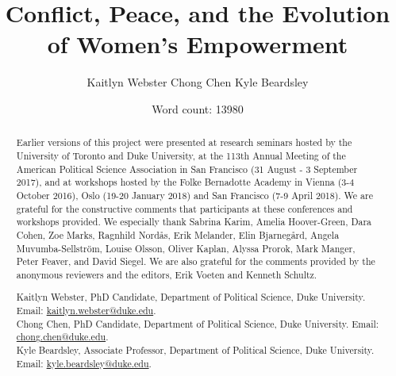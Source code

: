 \documentclass [12pt] {article}
\begin{document}
\renewcommand{\thefootnote}{\fnsymbol{footnote}}
\title{ \Large{Conflict, Peace, and the Evolution of Women's Empowerment}\footnotemark[1]\vspace*{.2in}}
\author{Kaitlyn Webster \hspace*{.2in} Chong Chen \hspace*{.2in} Kyle Beardsley \vspace*{.3in}}
\date{Word count: 13980}
\maketitle
\thispagestyle{empty}
\singlespacing
\renewcommand{\thefootnote}{\arabic{footnote}}

\newpage
\renewcommand{\abstractname}{\large Acknowledgments}
\begin{abstract}
  \bigskip
	\noindent
	Earlier versions of this project were presented at research seminars hosted by the University of Toronto and Duke University, at the 113th Annual Meeting of the American Political Science Association in San Francisco (31 August - 3 September 2017), and at workshops hosted by the Folke Bernadotte Academy in Vienna (3-4 October 2016), Oslo (19-20 January 2018) and San Francisco (7-9 April 2018). We are grateful for the constructive comments that participants at these conferences and workshops provided. We especially thank Sabrina Karim, Amelia Hoover-Green, Dara Cohen, Zoe Marks, Ragnhild Nord\r{a}s, Erik Melander, Elin Bjarneg\r{a}rd, Angela
Muvumba-Sellstr\"{o}m, Louise Olsson, Oliver Kaplan, Alyssa Prorok, Mark Manger, Peter Feaver, and David Siegel. We are also grateful for the comments provided by the anonymous reviewers and the editors, Erik Voeten and Kenneth Schultz.
\end{abstract}

\newpage
\renewcommand{\abstractname}{\large Author Affiliation and Email address}
\begin{abstract}
  \bigskip
	Kaitlyn Webster, PhD Candidate, Department of Political Science, Duke University. Email: \href{mailto:kaitlyn.webster@duke.edu}{kaitlyn.webster@duke.edu}.\\
	
	Chong Chen, PhD Candidate, Department of Political Science, Duke University. Email: \href{mailto:chong.chen@duke.edu}{chong.chen@duke.edu}.\\
	
	Kyle Beardsley, Associate Professor, Department of Political Science, Duke University. Email: \href{mailto:kyle.beardsley@duke.edu}{kyle.beardsley@duke.edu}.	
\end{abstract}
\end{document}
